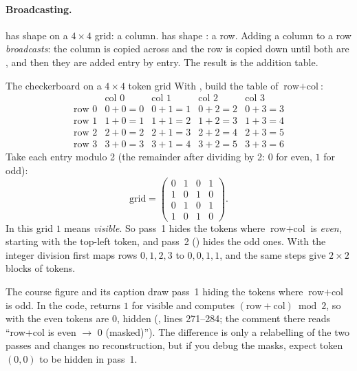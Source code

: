 \paragraph{Broadcasting.}  has shape  on a $4\times4$ grid: a column.
 has shape : a row. Adding a column to a row \emph{broadcasts}: the column
is copied across and the row is copied down until both are , and then they are added entry by
entry. The result is the addition table.

\begin{worked}[label={we:inference:checker}]{The checkerboard on a $4\times4$ token grid}
With , build the table of $\text{row}+\text{col}$:
\[
\begin{array}{c|cccc}
 & \text{col }0 & \text{col }1 & \text{col }2 & \text{col }3\\\hline
\text{row }0 & 0+0=0 & 0+1=1 & 0+2=2 & 0+3=3\\
\text{row }1 & 1+0=1 & 1+1=2 & 1+2=3 & 1+3=4\\
\text{row }2 & 2+0=2 & 2+1=3 & 2+2=4 & 2+3=5\\
\text{row }3 & 3+0=3 & 3+1=4 & 3+2=5 & 3+3=6
\end{array}
\]
Take each entry modulo 2 (the remainder after dividing by 2: $0$ for even, $1$ for odd):
\[
\text{grid}=\begin{pmatrix}0&1&0&1\\1&0&1&0\\0&1&0&1\\1&0&1&0\end{pmatrix}.
\]
In this grid $1$ means \emph{visible}. So pass~1 hides the tokens where $\text{row}+\text{col}$ is
\emph{even}, starting with the top-left token, and pass~2 () hides the odd ones. With
 the integer division first maps rows $0,1,2,3$ to $0,0,1,1$, and the same steps give
$2\times2$ blocks of tokens.
\end{worked}


\begin{sourcenote}
The course figure and its caption draw pass~1 hiding the tokens where $\text{row}+\text{col}$ is odd. In the
code,  returns $1$ for visible and computes $(\text{row}+\text{col})\bmod2$, so
with  the even tokens are $0$, hidden
(, lines 271--284; the comment there reads ``row+col
is even $\to$ 0 (masked)''). The difference is only a relabelling of the two passes and changes no
reconstruction, but if you debug the masks, expect token $(0,0)$ to be hidden in pass~1.
\end{sourcenote}

